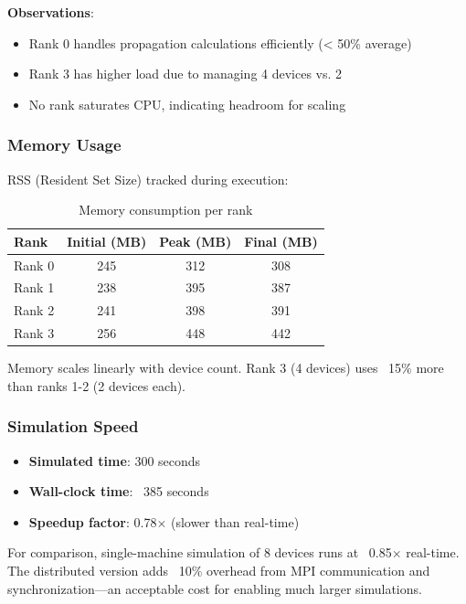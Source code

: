 \textbf{Observations}:
\begin{itemize}
    \item Rank 0 handles propagation calculations efficiently (< 50\% average)
    \item Rank 3 has higher load due to managing 4 devices vs. 2
    \item No rank saturates CPU, indicating headroom for scaling
\end{itemize}

\subsubsection{Memory Usage}

RSS (Resident Set Size) tracked during execution:

\begin{table}[htbp]
\centering
\caption{Memory consumption per rank}
\label{tab:memory-usage}
\begin{tabular}{@{}lccc@{}}
\toprule
\textbf{Rank} & \textbf{Initial (MB)} & \textbf{Peak (MB)} & \textbf{Final (MB)} \\
\midrule
Rank 0 & 245 & 312 & 308 \\
Rank 1 & 238 & 395 & 387 \\
Rank 2 & 241 & 398 & 391 \\
Rank 3 & 256 & 448 & 442 \\
\bottomrule
\end{tabular}
\end{table}

Memory scales linearly with device count. Rank 3 (4 devices) uses ~15\% more than ranks 1-2 (2 devices each).

\subsubsection{Simulation Speed}

\begin{itemize}
    \item \textbf{Simulated time}: 300 seconds
    \item \textbf{Wall-clock time}: ~385 seconds
    \item \textbf{Speedup factor}: 0.78× (slower than real-time)
\end{itemize}

For comparison, single-machine simulation of 8 devices runs at ~0.85× real-time. The distributed version adds ~10\% overhead from MPI communication and synchronization—an acceptable cost for enabling much larger simulations.

